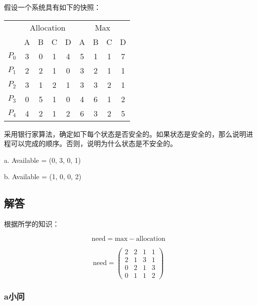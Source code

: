 \documentclass{article}
\begin{document}
假设一个系统具有如下的快照：

\begin{center}
	\begin{tabular}{|c|c|c|c|c|c|c|c|c|}
		\hline
		& \multicolumn{4}{|c|}{Allocation} & \multicolumn{4}{|c|}{Max} \\
		\cline{2-9}
		& A & B & C & D & A & B & C & D \\
		\hline
		$P_0$ & 3 & 0 & 1 & 4 & 5 & 1 & 1 & 7 \\
		\hline
		$P_1$ & 2 & 2 & 1 & 0 & 3 & 2 & 1 & 1 \\
		\hline
		$P_2$ & 3 & 1 & 2 & 1 & 3 & 3 & 2 & 1 \\
		\hline
		$P_3$ & 0 & 5 & 1 & 0 & 4 & 6 & 1 & 2 \\
		\hline
		$P_4$ & 4 & 2 & 1 & 2 & 6 & 3 & 2 & 5 \\
		\hline
	\end{tabular}
\end{center}

采用银行家算法，确定如下每个状态是否安全的。如果状态是安全的，那么说明进程可以完成的顺序。否则，说明为什么状态是不安全的。

a. Available = (0, 3, 0, 1)

b. Available = (1, 0, 0, 2)

\subsection{解答}

根据所学的知识：

\[
\text{need} = \text{max} - \text{allocation}
\]

\[
\text{need} = 
\begin{pmatrix}
	2 & 2 & 1 & 1 \\
	2 & 1 & 3 & 1 \\
	0 & 2 & 1 & 3 \\
	0 & 1 & 1 & 2
\end{pmatrix}
\]

\subsubsection{a小问}
\end{document}

